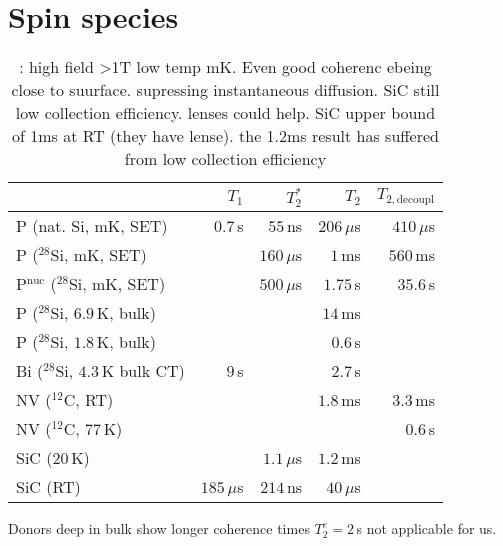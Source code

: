 
\section{Spin species}


\begin{table}
\begin{tabular}{lrrrr}
	& $T_1$ & $T_2^{*}$ & $T_2$ & $T_{2,\textrm{decoupl}}$ \\ \hline
P (nat. Si, mK, SET) \cite{Pla2012}& $0.7\, $s & $55\, $ns  & $206\, \mu$s & $410\, \mu$s  \\
P ($^{28}$Si, mK, SET) \cite{Muhonen2014}&  & $160\, \mu$s  & $1\, $ms & $560\, $ms \\
P$^{\text{nuc}}$ ($^{28}$Si, mK, SET) \cite{Muhonen2014}& & $500\, \mu$s & $1.75\, $s & $35.6\, $s \\
P ($^{28}$Si, $6.9\, $K, bulk) \cite{Morley2010}& &  & $14\, $ms &  \\
P ($^{28}$Si, $1.8\, $K, bulk) \cite{Tyryshkin2011}& &  & $0.6\, $s &  \\
Bi ($^{28}$Si, $4.3\, $K bulk CT) \cite{Wolfowicz2013} & $9\, $s &  & $2.7\, $s &\\
NV ($^{12}$C, RT) \cite{Balasubramanian2009,Bar-Gill2013} & & & $1.8\, $ms & $3.3\, $ms \\
NV ($^{12}$C, $77\, $K) \cite{Bar-Gill2013} & & &  & $0.6\, $s \\
SiC ($20\, $K) \cite{Christle2014} & & $1.1\, \mu$s & $1.2\, $ms &  \\
SiC (RT) \cite{Koehl2011} & $185\, \mu$s & $214\, $ns & $40\, \mu$s &   \\
\hline
\end{tabular} 
\label{lala}
\caption{\cite{Pla2012,Muhonen2014}: high field >1T low temp mK. Even good coherenc ebeing close to suurface. \cite{Tyryshkin2011} supressing instantaneous diffusion. SiC still low collection efficiency. lenses could help. SiC upper bound of 1ms at RT \cite{Widmann2014} (they have lense). the 1.2ms result has suffered from low collection efficiency}
\end{table}

Donors deep in bulk show longer coherence times $T_2^e=2\, $s \cite{Tyryshkin2011} not applicable for us.


